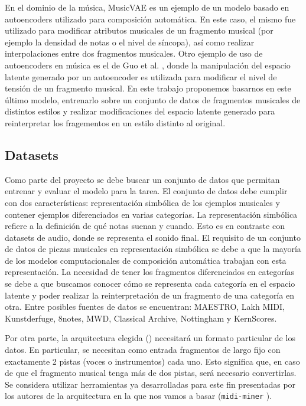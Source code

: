 \documentclass[10pt]{article}
\begin{document}
En el dominio de la música, MusicVAE \cite{roberts2019musicvae} es un ejemplo
de un modelo basado en autoencoders utilizado para composición automática. En
este caso, el mismo fue utilizado para modificar atributos musicales de un
fragmento musical (por ejemplo la densidad de notas o el nivel de 
síncopa), así como realizar interpolaciones entre dos fragmentos 
musicales. Otro ejemplo de uso de autoencoders en música es el de Guo et al. 
\cite{guo2020variational}, donde la manipulación del espacio latente generado
por un autoencoder es utilizada para modificar el nivel de tensión de un
fragmento musical. En este trabajo proponemos basarnos en este último modelo,
entrenarlo sobre un conjunto de datos de fragmentos musicales de distintos
estilos y realizar modificaciones del espacio latente generado para
reinterpretar los fragementos en un estilo distinto al original.

\subsection*{Datasets}
Como parte del proyecto se debe buscar un conjunto de datos que permitan
entrenar y evaluar el modelo para la tarea. El conjunto de datos debe cumplir
con dos características: representación simbólica de los ejemplos musicales y
contener ejemplos diferenciados en varias categorías. La representación
simbólica refiere a la definición de qué notas suenan y cuando. Esto es en
contraste con datasets de audio, donde se representa el sonido final. El
requisito de un conjunto de datos de piezas musicales en representación
simbólica se debe a que la mayoría de los modelos computacionales de
composición automática trabajan con esta representación.  La necesidad de tener
los fragmentos diferenciados en categorías se debe a que buscamos conocer cómo
se representa cada categoría en el espacio latente y poder realizar la
reinterpretación de un fragmento de una categoría en otra.  Entre posibles
fuentes de datos se encuentran: MAESTRO, Lakh MIDI, Kunstderfuge, 8notes, MWD,
Classical Archive, Nottingham y KernScores.

Por otra parte, la arquitectura elegida (\cite{guo2020variational})
necesitará un formato particular de los datos. En particular, se necesitan como
entrada fragmentos de largo fijo con exactamente 2 pistas (voces o
instrumentos) cada uno. Esto significa que, en caso de que el fragmento musical
tenga más de dos pistas, será necesario convertirlas. Se considera utilizar  
herramientas ya desarrolladas para este fin presentadas por los autores de la
arquitectura en la que nos vamos a basar (\texttt{midi-miner}
\cite{Guo-reduccion}).
\end{document}
